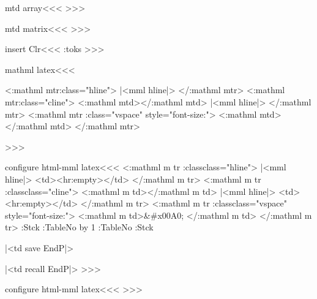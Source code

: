 {{{{{{\<mtd array\><<<
%
   \halignTD    \HCode{>}%
>>>

\<mtd matrix\><<<
%
   \halignTD    \HCode{>}%
>>>




\<insert Clr\><<<
\expandafter\tmp:toks\expandafter{\Clr}%
%
>>>





\<mathml latex\><<<
\def\:MM{m}
\def\mathml:hborder{%
\Configure{HBorder}
   {<\a:mathml mtr\Hnewline \mml:class="hline">} 
   {|<mml hline|>}
   {</\a:mathml mtr>}
   {<\a:mathml mtr\Hnewline \mml:class="cline">}
   {<\a:mathml mtd></\a:mathml mtd>}
   {|<mml hline|>}
   {</\a:mathml mtr>}
   {<\a:mathml mtr\Hnewline
         \mml:class="vspace" style="font-size:\HBorderspace">}
   {<\a:mathml mtd\Hnewline></\a:mathml mtd>}
   {</\a:mathml mtr>}
  }

  \mathml:hborder
>>>

\<configure html-mml latex\><<<
\def\:MM{\ifmathml \a:mathml m\fi}
   {<\:MM tr\Hnewline 
       \ifmathml \expandafter\mml:class\else class\fi="hline">} 
   {\ifmathml|<mml hline|>\else
            <td><hr\xml:empty></td>\fi} 
   {</\:MM tr>}
   {<\:MM tr\Hnewline
       \ifmathml \expandafter\mml:class\else class\fi ="cline">}
   {<\:MM td></\:MM td>}
   {\ifmathml|<mml hline|>\else
            <td><hr\xml:empty></td>\fi}
   {</\:MM tr>}
   {<\:MM tr\Hnewline
         \ifmathml \expandafter\mml:class\else  class\fi="vspace"
         style="font-size:\HBorderspace">}
   {<\:MM td\Hnewline>\ifmathml\else\string&\#x00A0;\fi
      </\:MM td>}
   {</\:MM tr>}
   {\EndP
    \PushStack\Table:Stck\TableNo 
    \gHAdvance\Next:TableNo by 1  
    \global\let\TableNo=\Next:TableNo 
    }
   {\PopStack\Table:Stck\TableNo}
   {\halignTR
               \HCode{ id="TBL-\TableNo-\HRow-">}}
   {}
   {|<td save EndP|> %
   \halignTD \HCode{\Hnewline 
               id="TBL-\TableNo-\HRow-\HCol">}\ShowPar\par}
   {\ifvmode \IgnorePar \fi \EndP
               |<td recall EndP|>}
>>>


\<configure html-mml latex\><<<
>>>

}}}}}}
